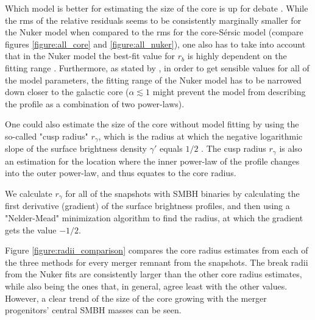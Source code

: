 \documentclass[english, oneside]{HYgradu}
\begin{document}
Which model is better for estimating the size of the core is up for debate \citep{Lauer2007, Dullo2012}. While the rms of the relative residuals seems to be consistently marginally smaller for the Nuker model when compared to the rms for the core-Sérsic model (compare figures \ref{figure:all_core} and \ref{figure:all_nuker}), one also has to take into account that in the Nuker model the best-fit value for $r_b$ is highly dependent on the fitting range \citep{Graham2003Nuker}. Furthermore, as stated by \cite{Rantala2018}, in order to get sensible values for all of the model parameters, the fitting range of the Nuker model has to be narrowed down closer to the galactic core ($\alpha \lesssim 1$ might prevent the model from describing the profile as a combination of two power-laws).

One could also estimate the size of the core without model fitting by using the so-called "cusp radius" $r_\gamma$, which is the radius at which the negative logarithmic slope of the surface brightness density $\gamma'$ equals $1/2$ \citep{Carollo1997, Lauer2007Cusp}. The cusp radius $r_\gamma$ is also an estimation for the location where the inner power-law of the profile changes into the outer power-law, and thus equates to the core radius. 

We calculate $r_\gamma$ for all of the snapshots with SMBH binaries by calculating the first derivative (gradient) of the surface brightness profiles, and then using a "Nelder-Mead" minimization algorithm to find the radius, at which the gradient gets the value $-1/2$. 

Figure \ref{figure:radii_comparison} compares the core radius estimates from each of the three methods for every merger remnant from the snapshots. The break radii from the Nuker fits are consistently larger than the other core radius estimates, while also being the ones that, in general, agree least with the other values. However, a clear trend of the size of the core growing with the merger progenitors' central SMBH masses can be seen.
\end{document}
